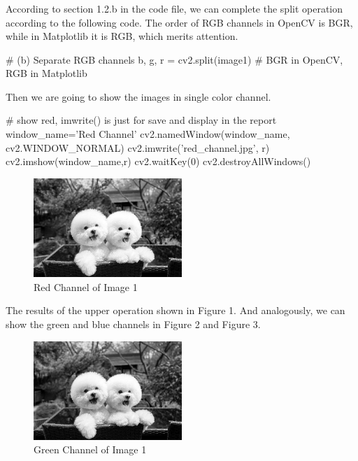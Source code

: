 \documentclass[12pt]{article}
\begin{document}
\subsubsection{}


\quad According to section 1.2.b in the code file, we can complete the split operation according to the following code. The order of RGB channels in OpenCV is BGR, while in Matplotlib it is RGB, which merits attention.
\begin{python}
  # (b) Separate RGB channels
  b, g, r = cv2.split(image1)
  # BGR in OpenCV, RGB in Matplotlib
\end{python}

Then we are going to show the images in single color channel.
\begin{python}
  # show red, imwrite() is just for save and display in the report
  window_name='Red Channel'
  cv2.namedWindow(window_name, cv2.WINDOW_NORMAL)
  cv2.imwrite('red_channel.jpg', r)
  cv2.imshow(window_name,r)
  cv2.waitKey(0)
  cv2.destroyAllWindows()
\end{python}

\begin{figure}[H]
  \centering
  \includegraphics[width=0.5\textwidth]{red_channel.jpg}
  \caption{Red Channel of Image 1}
  \label{fig:example}
\end{figure}

The results of the upper operation shown in Figure 1. And analogously, we can show the green and blue channels in Figure 2 and Figure 3.

\begin{figure}[H]
  \centering
  \includegraphics[width=0.5\textwidth]{green_channel.jpg}
  \caption{Green Channel of Image 1}
  \label{fig:example}
\end{figure}
\end{document}
